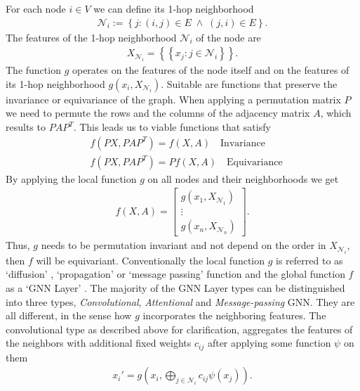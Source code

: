 For each node $i \in V$ we can define its 1-hop neighborhood
\begin{align}
    \mathcal{N}_i := \left\{ j: (i,j) \in E\; \wedge \; (j, i) \in E
    \right\}.
\end{align}
The features of the 1-hop neighborhood $\mathcal{N}_i$ of the node are
\begin{align}
    X_{\mathcal{N}_i} = \left\{ \left\{ x_j: j \in \mathcal{N}_i \right\}
    \right\} .
\end{align}
The function $g$ operates on the features of the node
itself and on the features of its 1-hop neighborhood $g\left(x_i,
X_{\mathcal{N}_i}\right)$. Suitable are functions that preserve the invariance
or equivariance of the graph. When applying a permutation matrix $P$ we need
to permute the rows and the columns of the adjacency matrix $A$, which
results to $PAP^{T}$. This leads us to viable functions that satisfy
\begin{align}
    &f(PX, PAP^{T}) = f(X, A) \quad \text{Invariance}\\
    &f(PX, PAP^{T}) = Pf(X, A) \quad \text{Equivariance}
\end{align}
By applying the local function $g$ on all nodes and their neighborhoods we
get
\begin{align}
    f(X, A) =
    \begin{bmatrix}
        g(x_1, X_{\mathcal{N}_1})\\
        \vdots\\
        g(x_n, X_{\mathcal{N}_n})
    \end{bmatrix}.
\end{align}
Thus, $g$ needs to be permutation invariant and not depend on the order in
$X_{\mathcal{N}_i}$, then $f$ will be equivariant. Conventionally the local
function $g$ is referred to as `diffusion' , `propagation' or `message
passing' function and the global function $f$ as a `GNN Layer'
\cite[Chapter~5]{gnn_overview}. The majority of the GNN Layer types can be
distinguished into three types, \textit{Convolutional}, \textit{Attentional}
and \textit{Message-passing} GNN. They are all different, in the sense how $g$
incorporates the neighboring features.
\newline
The convolutional type \cite[Chapter~5]{gnn_overview} as described above for
clarification, aggregates the features of the neighbors with additional
fixed weights $c_{ij}$ after applying some function $\psi$ on them
\begin{align}
    x_i' = g\left( x_i, \bigoplus_{j\in \mathcal{N}_i} c_{ij} \psi(x_j) \right).
\end{align}
